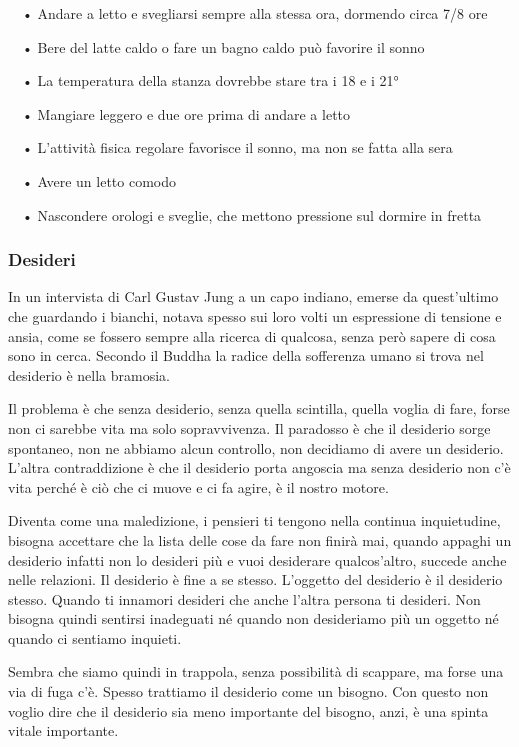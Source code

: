 \documentclass[12pt]{book} %
\begin{document}
\begin{mdframed}[linewidth=1pt]
\ \ • Andare a letto e svegliarsi sempre alla stessa ora, dormendo circa 7/8 ore

\ \ • Bere del latte caldo o fare un bagno caldo può favorire il sonno

\ \ • La temperatura della stanza dovrebbe stare tra i 18 e i 21°

\ \ • Mangiare leggero e due ore prima di andare a letto

\ \ • L'attività fisica regolare favorisce il sonno, ma non se fatta alla sera

\ \ • Avere un letto comodo 

\ \ • Nascondere orologi e sveglie, che mettono pressione sul dormire in fretta
\end{mdframed}

\bigskip

\subsubsection{Desideri}
In un intervista di Carl Gustav Jung a un capo indiano, emerse da quest'ultimo che guardando i
bianchi, notava spesso sui loro volti un espressione di tensione e ansia, come se fossero sempre alla ricerca di
qualcosa, senza però sapere di cosa sono in cerca. Secondo il Buddha la radice della sofferenza umano si trova nel
desiderio è nella bramosia.

Il problema è che senza desiderio, senza quella scintilla, quella voglia di fare, forse non ci sarebbe vita ma solo
sopravvivenza. Il paradosso è che il desiderio sorge spontaneo, non ne abbiamo alcun controllo, non decidiamo di avere
un desiderio. L'altra contraddizione è che il desiderio porta angoscia ma senza desiderio non c'è vita perché è ciò che
ci muove e ci fa agire, è il nostro motore. 

Diventa come una maledizione, i pensieri ti tengono nella continua inquietudine, bisogna accettare che la lista delle cose da fare non finirà mai, quando appaghi un desiderio infatti non lo desideri più e vuoi desiderare qualcos'altro, succede anche nelle relazioni. Il desiderio è fine a se stesso.
L'oggetto del desiderio è il desiderio stesso. Quando ti innamori desideri che anche
l'altra persona ti desideri. Non bisogna quindi sentirsi inadeguati né quando non desideriamo più
un oggetto né quando ci sentiamo inquieti.

Sembra che siamo quindi in trappola, senza possibilità di scappare, ma forse una via di fuga c'è.
Spesso trattiamo il desiderio come un bisogno. Con questo non voglio dire che il desiderio sia meno importante del
bisogno, anzi, è una spinta vitale importante.
\end{document}
